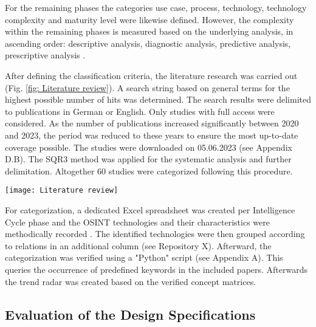 \documentclass[10pt]{article}
\begin{document}
For the remaining phases the categories use case, process,
technology, technology complexity and maturity level
were likewise defined. However, the complexity within the remaining
phases is measured based on the underlying analysis, in
ascending order: descriptive analysis, diagnostic analysis, predictive
analysis, prescriptive analysis \cite{Delen.2013,GartnerGmbH.2012}.

After defining the classification criteria, the literature research
was carried out (Fig. \ref{fig: Literature review}). A search string based on
general terms for the highest possible number of hits was determined.
The search results were delimited to publications in German or English. Only studies
with full access were considered. As the number of publications
increased significantly between 2020 and 2023, the period was reduced
to these years to ensure the most up-to-date coverage possible.
The studies were downloaded on 05.06.2023 (see Appendix D.B). The
SQR3 method \cite{Robinson.1970} was applied for the systematic analysis and further
delimitation. Altogether 60 studies were categorized following this
procedure.

\begin{figure*}[thb]
    \centering
    \texttt{[image: Literature review]}
    \caption{Literature review}
    \label{fig: Literature review}
\end{figure*}

For categorization, a dedicated Excel spreadsheet was created per
Intelligence Cycle phase and the OSINT technologies and their
characteristics were methodically recorded \cite{Cleven.2009, Webster.2002}. The identified
technologies were then grouped according to relations in an
additional column (see Repository X). Afterward, the categorization was
verified using a "Python" script (see Appendix A). This
queries the occurrence of predefined keywords in the included papers.
Afterwards the trend radar was created based on the verified concept matrices.

\subsection{Evaluation of the Design Specifications}
\end{document}
